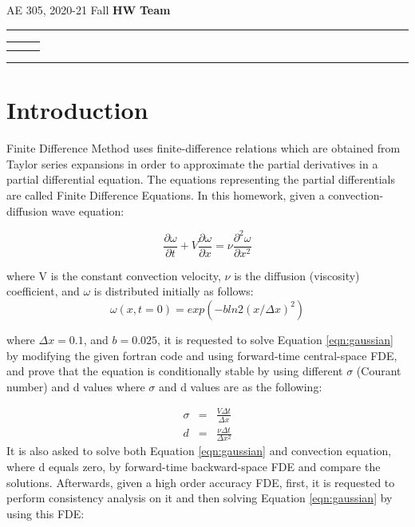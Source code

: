 \documentclass[letterpaper,12pt]{article}
\begin{document}
\begin{center}
AE 305, 2020-21 Fall \hfill \textbf{HW \HWno} \hfill \textbf{Team \TeamNo} \\
\noindent\rule{\textwidth}{0.4pt}
\begin{tabular}{p{} | p{} | p{} }
	\AuthorOneName&\AuthorTwoName&\AuthorThreeName\\
	\textit{\AuthorOneID}&\textit{\AuthorTwoID}&\textit{\AuthorThreeID}
\end{tabular}
\noindent\rule{\textwidth}{0.4pt}
\end{center}


\section{Introduction}
Finite Difference Method uses finite-difference relations which are obtained from Taylor
series expansions in order to approximate the partial derivatives in a partial differential
equation. The equations representing the partial differentials are called Finite Difference
Equations. In this homework, given a convection-diffusion wave equation:

\begin{equation}
	\frac{\partial \omega}{\partial t} + V\frac{\partial \omega}{\partial x} = \nu\frac{\partial^2 \omega}{\partial x^2}
	\label{eqn:gaussian}
\end{equation}

where V is the constant convection velocity, $\nu$ is the diffusion (viscosity) coefficient,
and $\omega$ is distributed initially as follows:
\begin{equation}
	\omega(x,t=0) = exp(-b ln2(x/\Delta x)^2)
\end{equation}

where $\Delta x = 0.1$, and $b = 0.025$, it is requested to solve Equation \ref{eqn:gaussian} by modifying the given fortran code and
using forward-time central-space FDE, and prove that the equation is conditionally stable by
using different $\sigma$ (Courant number) and d values where $\sigma$ and d values are as the following:

\begin{eqnarray}
	\sigma &=& \frac{V\Delta t}{\Delta x} \nonumber \\
	d &=& \frac{\nu\Delta t}{\Delta x^2}
\end{eqnarray}
It is also asked to solve both Equation \ref{eqn:gaussian} and convection equation, where d equals
zero, by forward-time backward-space FDE and compare the solutions. Afterwards, given a high order
accuracy FDE, first, it is requested to perform consistency analysis on it and then solving
Equation \ref{eqn:gaussian} by using this FDE:
\end{document}
